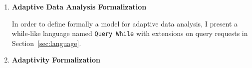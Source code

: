 \begin{enumerate}
 \item
 \textbf{Adaptive Data Analysis Formalization}

In order to define formally a model for adaptive data analysis,
I present a while-like language named {\tt Query While}
with extensions on query requests in Section~\ref{sec:language}.

\item 
\textbf{Adaptivity Formalization}


\end{enumerate}
